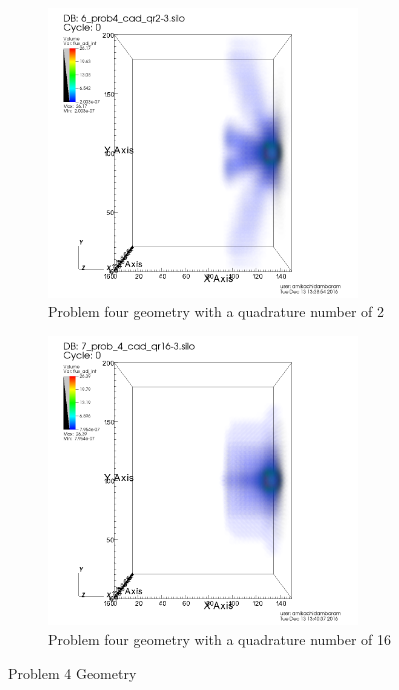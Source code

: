 \documentclass[10pt]{article}
\begin{document}
\begin{figure}[!ht]
\centering
\begin{subfigure}{0.49\textwidth}
\centering
\includegraphics[width = 0.9\textwidth]{visit/visit-prob_4-02}
\caption{Problem four geometry with a quadrature number of 2}
\label{visit:prob_4-02}
\end{subfigure}
\hfill
\begin{subfigure}{0.49\textwidth}
\centering
\includegraphics[width = 0.9\textwidth]{visit/visit-prob_4-16}
\caption{Problem four geometry with a quadrature number of 16}
\label{visit:prob_4-16}
\end{subfigure}
\caption{Problem 4 Geometry}
\label{visit:prob_4}
\end{figure}
\end{document}
